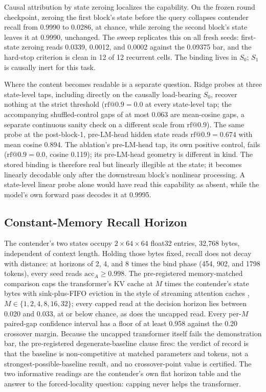 Causal attribution by state zeroing localizes the capability. On the
frozen round checkpoint, zeroing the first block's state before the
query collapses contender recall from 0.9990 to 0.0286, at chance,
while zeroing the second block's state leaves it at 0.9990, unchanged. The sweep replicates this on all fresh seeds:
first-state zeroing reads 0.0339, 0.0012, and 0.0002 against the 0.09375
bar, and the hard-stop criterion is clean in 12 of 12 recurrent cells. The binding lives in $S_0$; $S_1$ is causally
inert for this task.

Where the content becomes readable is a separate question. Ridge
probes at three state-level taps, including
directly on the causally load-bearing $S_0$, recover nothing at the
strict threshold ($\mathrm{rf@0.9} = 0.0$ at every state-level tap; the
accompanying shuffled-control gaps of at most 0.063 are mean-cosine
gaps, a separate continuous sanity check on a different scale from
$\mathrm{rf@0.9}$). The same
probe at the post-block-1, pre-LM-head hidden state reads
$\mathrm{rf@0.9} = 0.674$ with mean cosine 0.894.
The ablation's pre-LM-head tap, its own positive control, fails
($\mathrm{rf@0.9} = 0.0$, cosine 0.119); its
pre-LM-head geometry is different in kind. The stored binding is
therefore real but linearly illegible at the state; it becomes linearly
decodable only after the downstream block's nonlinear processing. A
state-level linear probe alone would have read this capability as
absent, while the model's own forward pass decodes it at 0.9995.

\subsection{Constant-Memory Recall Horizon}

The contender's two states occupy $2 \times 64 \times 64$ float32
entries, 32,768 bytes, independent of context length. Holding those bytes fixed, recall does not decay
with distance: at horizons of 2, 4, and 8 times the bind phase (454,
902, and 1798 tokens), every seed reads $\mathrm{acc}_A \ge 0.998$. The pre-registered memory-matched comparison
caps the transformer's KV cache at $M$ times the contender's state
bytes with sink-plus-FIFO eviction in the style of streaming attention
caches \citep{xiao2024efficientstreaminglanguagemodels}, $M \in \{1, 2, 4, 8, 16, 32\}$;
every capped read at the decision horizon lies between 0.020 and 0.033,
at or below chance, as does the uncapped read.
Every per-$M$ paired-gap confidence interval has a floor of at least
0.958 against the 0.20 crossover margin. Because
the uncapped transformer itself fails the demonstration bar, the
pre-registered degenerate-baseline clause fires: the verdict of record
is that the baseline is non-competitive at matched parameters and
tokens, not a strongest-possible-baseline result, and no
crossover-point value is certified. The two
informative readings are the contender's own flat horizon table and the
answer to the forced-locality question: capping never helps the
transformer.

